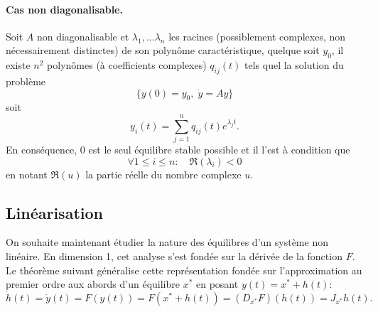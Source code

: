 \paragraph*{Cas non diagonalisable.}

\begin{theorem}
  Soit $A$ non diagonalisable et $\lambda_1, \dots \lambda_n$ les racines (possiblement complexes, non nécessairement distinctes) de son polynôme caractéristique, quelque soit $y_0$, il existe $n^2$ polynômes (à coefficients complexes) $q_{ij}(t)$ tels quel la solution du problème
  $$
  \{y(0) = y_0, \; \dot y = A y\}
  $$
  soit
  $$
  y_i(t) = \sum_{j=1}^n q_{ij}(t) e^{\lambda_j t}.
  $$
  En conséquence, 0 est le seul équilibre stable possible et il l'est à condition que
  $$
  \forall 1 \leq i \leq n: \quad \Re(\lambda_i) < 0
  $$
  en notant $\Re(u)$ la partie réelle du nombre complexe $u$.
\end{theorem}


\subsection{Linéarisation} 

On souhaite maintenant étudier la nature des équilibres d'un système non linéaire. En dimension 1, cet analyse s'est fondée sur la dérivée de la fonction $F$. Le théorème suivant généralise cette représentation fondée sur l'approximation au premier ordre aux abords d'un équilibre $x^*$ en posant $y(t) = x^* + h(t)$: 
$$
\dot h(t) = \dot y (t) = F(y(t)) = F(x^* + h(t)) = (D_{x^*} F)(h(t)) = J_{x^*} h(t).
$$

